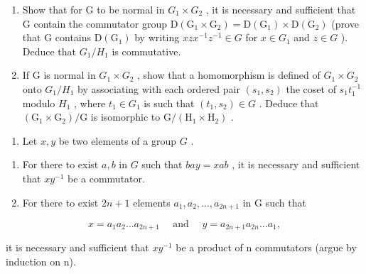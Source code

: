\begin{enumerate}
\def\labelenumi{(\alph{enumi})}
\item
  Show that for G to be normal in \(G_{1} \times G_{2}\) , it is necessary and sufficient that G contain the commutator group \(\mathrm{D}(\mathrm{G}_{1} \times \mathrm{G}_{2}) = \mathrm{D}(\mathrm{G}_{1}) \times \mathrm{D}(\mathrm{G}_{2})\) (prove that G contains \(\mathrm{D}(\mathrm{G}_{1})\) by writing \(xzx^{-1}z^{-1} \in G\) for \(x \in G_{1}\) and \(z \in G\) ). Deduce that \(G_{1}/H_{1}\) is commutative.
\item
  If G is normal in \(G_{1} \times G_{2}\) , show that a homomorphism is defined of \(G_{1} \times G_{2}\) onto \(G_{1}/H_{1}\) by associating with each ordered pair \((s_{1}, s_{2})\) the coset of \(s_{1}t_{1}^{-1}\) modulo \(H_{1}\) , where \(t_{1} \in G_{1}\) is such that \((t_{1}, s_{2}) \in G\) . Deduce that \((\mathrm{G}_{1} \times \mathrm{G}_{2})/\mathrm{G}\) is isomorphic to \(\mathrm{G}/(\mathrm{H}_{1} \times \mathrm{H}_{2})\) .
\end{enumerate}

\begin{enumerate}
\def\labelenumi{\arabic{enumi}.}
\setcounter{enumi}{40}
\tightlist
\item
  Let \(x, y\) be two elements of a group \(G\) .
\end{enumerate}

\begin{enumerate}
\def\labelenumi{(\alph{enumi})}
\item
  For there to exist \(a, b\) in \(G\) such that \(bay = xab\) , it is necessary and sufficient that \(xy^{-1}\) be a commutator.
\item
  For there to exist \(2n + 1\) elements \(a_1, a_2, \ldots, a_{2n+1}\) in G such that
\end{enumerate}

\[
x = a _ {1} a _ {2} \dots a _ {2 n + 1} \quad \text { and } \quad y = a _ {2 n + 1} a _ {2 n} \dots a _ {1},
\]

it is necessary and sufficient that \(xy^{-1}\) be a product of n commutators (argue by induction on n).
